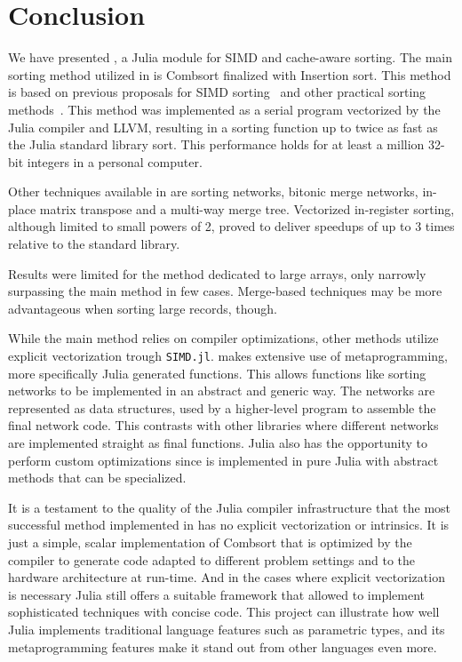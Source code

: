 \documentclass{juliacon}
\begin{document}
\section{Conclusion}
\label{sec:conclusion}
%
We have presented \chipsort, a Julia module for SIMD and cache-aware sorting. The main sorting method utilized in \chipsort is Combsort finalized with Insertion sort. This method is based on previous proposals for SIMD sorting~\cite{DBLP:conf/IEEEpact/InoueMKN07,DBLP:journals/pvldb/InoueT15} and other practical sorting methods~\cite{INCERPI198737,musser1997introspective}. This method was implemented as a serial program vectorized by the Julia compiler and LLVM, resulting in a sorting function up to twice as fast as the Julia standard library sort. This performance holds for at least a million 32-bit integers in a personal computer.

Other techniques available in \chipsort are sorting networks, bitonic merge networks, in-place matrix transpose and a multi-way merge tree. Vectorized in-register sorting, although limited to small powers of 2, proved to deliver speedups of up to 3 times relative to the standard library.

Results were limited for the method dedicated to large arrays, only narrowly surpassing the main \chipsort method in few cases. Merge-based techniques may be more advantageous when sorting large records, though.

While the main \chipsort method relies on compiler optimizations, other methods utilize explicit vectorization trough {\tt SIMD.jl}. \chipsort makes extensive use of metaprogramming, more specifically Julia generated functions. This allows functions like sorting networks to be implemented in an abstract and generic way. The networks are represented as data structures, used by a higher-level program to assemble the final network code. This contrasts with other libraries where different networks are implemented straight as final functions. Julia also has the opportunity to perform custom optimizations since \chipsort is implemented in pure Julia with abstract methods that can be specialized.

It is a testament to the quality of the Julia compiler infrastructure that the most successful method implemented in \chipsort has no explicit vectorization or intrinsics. It is just a simple, scalar implementation of Combsort that is optimized by the compiler to generate code adapted to different problem settings and to the hardware architecture at run-time. And in the cases where explicit vectorization is necessary Julia still offers a suitable framework that allowed \chipsort to implement sophisticated techniques with concise code. This project can illustrate how well Julia implements traditional language features such as parametric types, and its metaprogramming features make it stand out from other languages even more.
\end{document}
